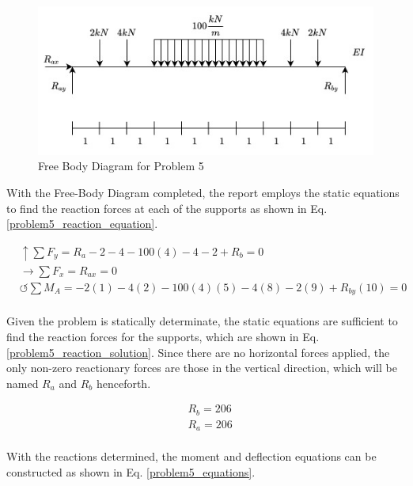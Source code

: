 \documentclass[a4paper]{article}
\begin{document}
\begin{figure}[h]
\includegraphics[width=\textwidth]{FBD/FBD_5.jpg}
\caption{Free Body Diagram for Problem 5}
\label{FBD_5}
\end{figure}

With the Free-Body Diagram completed, the report employs the static equations to find the reaction forces at each of the supports as shown in Eq. \ref{problem5_reaction_equation}.

\begin{equation}
\begin{split}
	&\uparrow \sum F_y = R_a - 2 - 4 - 100(4) -4 -2 + R_b = 0 \\
 	&\rightarrow \sum F_x = R_{ax} = 0 \\
 	&\circlearrowleft \sum M_A = -2(1) - 4(2) -100(4)(5) - 4(8) - 2(9) + R_{by}(10) = 0 \\
\end{split}
\label{problem5_reaction_equation}
\end{equation}

Given the problem is statically determinate, the static equations are sufficient to find the reaction forces for the supports, which are shown in Eq. \ref{problem5_reaction_solution}. Since there are no horizontal forces applied, the only non-zero reactionary forces are those in the vertical direction, which will be named $R_a$ and $R_b$ henceforth.

\begin{equation}
\begin{split}
	& R_b = 206 \\
	& R_a = 206 \\
\end{split}
\label{problem5_reaction_solution}
\end{equation}

With the reactions determined, the moment and deflection equations can be constructed as shown in Eq. \ref{problem5_equations}.
\end{document}
